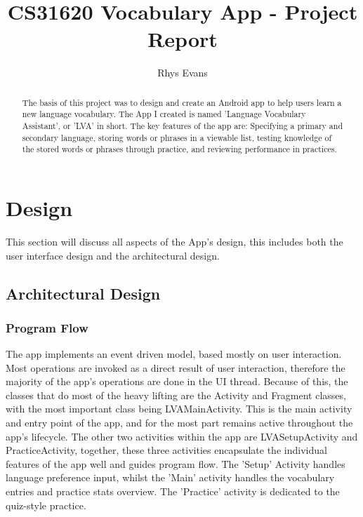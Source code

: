 \documentclass[runningheads]{llncs}
\begin{document}
	\title{CS31620 Vocabulary App - Project Report}
	\author{Rhys Evans}
	\maketitle
	
	\begin{abstract}
		The basis of this project was to design and create an Android app to help users learn a new language vocabulary. The App I created is named 'Language Vocabulary Assistant', or 'LVA' in short. The key features of the app are: Specifying a primary and secondary language, storing words or phrases in a viewable list, testing knowledge of the stored words or phrases through practice, and reviewing performance in practices.
	\end{abstract}
	
	\newpage
	\section{Design}
	This section will discuss all aspects of the App's design, this includes both the user interface design and the architectural design.  
	\subsection{Architectural Design}
	\subsubsection{Program Flow}
	The app implements an event driven model, based mostly on user interaction. Most operations are invoked as a direct result of user interaction, therefore the majority of the app's operations are done in the UI thread. Because of this, the classes that do most of the heavy lifting are the Activity and Fragment classes, with the most important class being LVAMainActivity. This is the main activity and entry point of the app, and for the most part remains active throughout the app's lifecycle. The other two activities within the app are LVASetupActivity and PracticeActivity, together, these three activities encapsulate the individual features of the app well and guides program flow. The 'Setup' Activity handles language preference input, whilst the 'Main' activity handles the vocabulary entries and practice stats overview. The 'Practice' activity is dedicated to the quiz-style practice.
	
\end{document}
